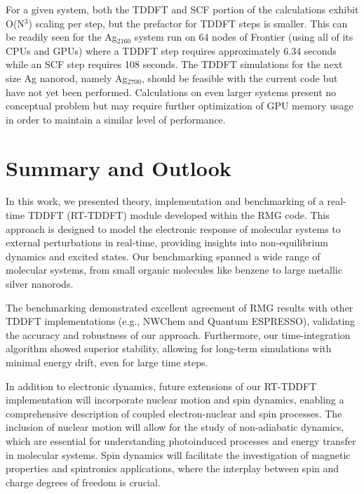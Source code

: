 \documentclass[journal=jctcce,manuscript=article,etalmode=truncate,maxauthors=10,layout=twocolumn,9pt]{achemso}   %
\begin{document}
For a given system, both the TDDFT and SCF portion of the calculations exhibit O(N$^3$) scaling per step, but the prefactor for TDDFT steps is smaller. This can be readily seen for the Ag$_{2160}$ system run on 64 nodes of Frontier (using all of its CPUs and GPUs) where a TDDFT step requires approximately 6.34  seconds while an SCF step requires 108 seconds.  The   TDDFT simulations for the next size  Ag nanorod, namely Ag$_{2700}$,  should be feasible with the current code but have not yet been performed. 
Calculations on even larger systems present no conceptual problem but may require further optimization of GPU memory usage in order to maintain a similar level of performance.






\section{Summary and Outlook}


In this work, we presented theory,  implementation and benchmarking of a real-time TDDFT (RT-TDDFT) module developed within the RMG code. This approach is designed to model the electronic response of molecular systems to external perturbations in real-time, providing insights into non-equilibrium dynamics and excited states. Our benchmarking spanned a wide range of molecular systems, from small organic molecules like benzene to large metallic silver nanorods.

The benchmarking demonstrated excellent agreement of RMG results with other TDDFT implementations (e.g., NWChem and Quantum ESPRESSO), validating the accuracy and robustness of our approach. Furthermore, our time-integration algorithm showed superior stability, allowing for long-term simulations with minimal energy drift, even for large time steps.

In addition to electronic dynamics, future extensions of our RT-TDDFT implementation will incorporate nuclear motion and spin dynamics, enabling a comprehensive description of coupled electron-nuclear and spin processes. The inclusion of nuclear motion will allow for the study of non-adiabatic dynamics, which are essential for understanding photoinduced processes and energy transfer in molecular systems. Spin dynamics will facilitate the investigation of magnetic properties and spintronics applications, where the interplay between spin and charge degrees of freedom is crucial.
\end{document}
